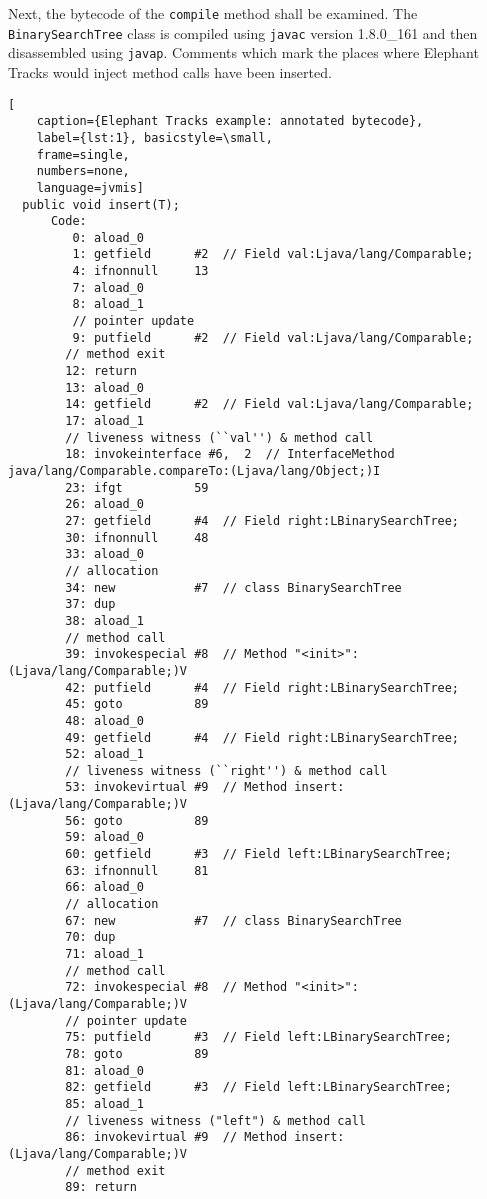Next, the bytecode of the \lstinline{compile} method shall be examined. The \lstinline{BinarySearchTree} class
is compiled using \lstinline{javac} version 1.8.0\_161 and then disassembled using \lstinline{javap}. Comments which mark the places where
Elephant Tracks would inject method calls have been inserted.
\begin{lstlisting}[
    caption={Elephant Tracks example: annotated bytecode},
    label={lst:1}, basicstyle=\small,
    frame=single,
    numbers=none,
    language=jvmis]
  public void insert(T);
      Code:
         0: aload_0
         1: getfield      #2  // Field val:Ljava/lang/Comparable;
         4: ifnonnull     13
         7: aload_0
         8: aload_1
         // pointer update
         9: putfield      #2  // Field val:Ljava/lang/Comparable;
        // method exit
        12: return
        13: aload_0
        14: getfield      #2  // Field val:Ljava/lang/Comparable;
        17: aload_1
        // liveness witness (``val'') & method call
        18: invokeinterface #6,  2  // InterfaceMethod java/lang/Comparable.compareTo:(Ljava/lang/Object;)I
        23: ifgt          59
        26: aload_0
        27: getfield      #4  // Field right:LBinarySearchTree;
        30: ifnonnull     48
        33: aload_0
        // allocation
        34: new           #7  // class BinarySearchTree
        37: dup
        38: aload_1
        // method call
        39: invokespecial #8  // Method "<init>":(Ljava/lang/Comparable;)V
        42: putfield      #4  // Field right:LBinarySearchTree;
        45: goto          89
        48: aload_0
        49: getfield      #4  // Field right:LBinarySearchTree;
        52: aload_1
        // liveness witness (``right'') & method call
        53: invokevirtual #9  // Method insert:(Ljava/lang/Comparable;)V
        56: goto          89
        59: aload_0
        60: getfield      #3  // Field left:LBinarySearchTree;
        63: ifnonnull     81
        66: aload_0
        // allocation
        67: new           #7  // class BinarySearchTree
        70: dup
        71: aload_1
        // method call
        72: invokespecial #8  // Method "<init>":(Ljava/lang/Comparable;)V
        // pointer update
        75: putfield      #3  // Field left:LBinarySearchTree;
        78: goto          89
        81: aload_0
        82: getfield      #3  // Field left:LBinarySearchTree;
        85: aload_1
        // liveness witness ("left") & method call
        86: invokevirtual #9  // Method insert:(Ljava/lang/Comparable;)V
        // method exit
        89: return
\end{lstlisting}

